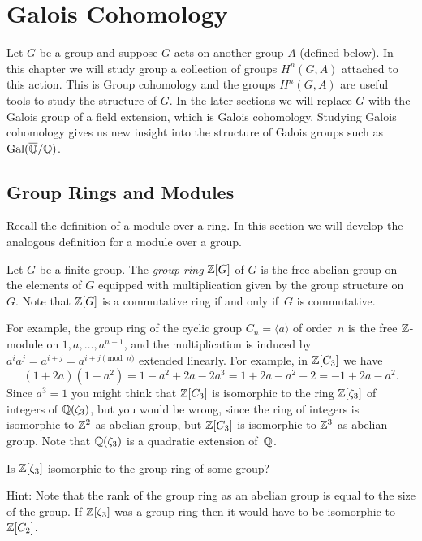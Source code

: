 \chapter{Galois Cohomology}\label{ch:gc}

Let $G$ be a group and suppose $G$ acts on
another group $A$ (defined below).
In this chapter we will study group a
collection of groups $H^n(G,A)$ attached to this
action. This is Group cohomology and the groups $H^n(G,A)$
are useful tools to study the structure of $G$.
In the later sections we will replace $G$
with the Galois group of a field extension,
which is Galois cohomology. Studying Galois cohomology
gives us new insight into the structure of
Galois groups such as $\operatorname{Gal}(\overline{\mathbb{Q}}/\mathbb{Q})$.


\section{Group Rings and Modules}

Recall the definition of a module over a ring.
In this section we will develop the analogous
definition for a module over a group.

\begin{definition}\label{def:groupring}
	Let $G$ be a finite group. The \emph{group ring} $\mathbb{Z}[G]$ of $G$
	is the free abelian group on the elements of $G$ equipped
	with multiplication given by the group structure on~$G$.
	Note that $\mathbb{Z}[G]$ is a commutative ring if and only if~$G$ is
	commutative.
\end{definition}


\begin{example}
	For example, the group ring of the cyclic group
	$C_n=\langle a\rangle$ of order~$n$ is
	the free $\mathbb{Z}$-module on $1,a,\ldots, a^{n-1}$, and the multiplication
	is induced by $a^i a^j = a^{i+j} = a^{i + j \pmod{n}}$ extended
	linearly. For example, in  $\mathbb{Z}[C_3]$ we have
	$$
	(1 + 2 a)(1 - a^2) = 1 - a^2 + 2a - 2 a^3
	= 1 + 2a - a^2 - 2 = -1 + 2a - a^2.
	$$
	Since $a^3 = 1$
	you might think that $\mathbb{Z}[C_3]$ is isomorphic to the ring $\mathbb{Z}[\zeta_3]$
	of integers of $\mathbb{Q}(\zeta_3)$, but you would be wrong, since the ring
	of integers is isomorphic to $\mathbb{Z}^2$ as abelian group, but $\mathbb{Z}[C_3]$
	is isomorphic to $\mathbb{Z}^3$ as abelian group. Note that $\mathbb{Q}(\zeta_3)$
	is a quadratic extension of~$\mathbb{Q}$.
\end{example}

\begin{exercise}
	Is $\mathbb{Z}[\zeta_3]$ isomorphic to the group ring of some group?
	
	Hint: Note that the rank of the group ring as an
	abelian group is equal to the size of the group.
	If $\mathbb{Z}[\zeta_3]$ was a group ring then it would
	have to be isomorphic to $\mathbb{Z}[C_2]$.
\end{exercise}

